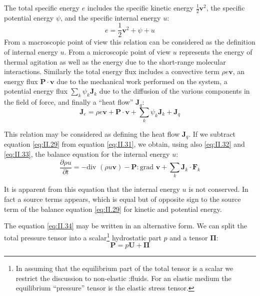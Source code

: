 The total specific energy $e$ includes the specific kinetic energy $\frac{1}{2} \bm{v}^2$, the specific potential energy $\psi$, and the specific internal energy $u$:
\begin{equation}
e = \frac{1}{2} \bm{v}^2 + \psi + u
    \label{eq:II.32}
\end{equation}
From a macroscopic point of view this relation can be considered as
the definition of internal energy $u$. From a microscopic point of view $u$ represents the energy of thermal agitation as well as the energy due
to the short-range molecular interactions. Similarly the total energy
flux includes a convective term $\rho e \bm{v}$, an energy flux $\bm{P} \cdot \bm{v}$ due to the mechanical work performed on the system, a potential energy flux $\sum_k \psi_k \bm{J}_k$ due to the diffusion of the various components in the field of force, and finally a ``heat flow'' $\bm{J}_q$:
\begin{equation}
    \bm{J}_e = \rho e \bm{v} + \bm{P} \cdot \bm{v} + \sum_k \psi_k \bm{J}_k + \bm{J}_q
    \label{eq:II.33}
\end{equation}

This relation may be considered as defining the heat flow $\bm{J}_q$. If we subtract equation \eqref{eq:II.29} from equation \eqref{eq:II.31}, we obtain, using also \eqref{eq:II.32} and \eqref{eq:II.33}, the balance equation for the internal energy $u$:
\begin{equation}
\frac{\partial \rho u}{\partial t} = - \textrm{div } \left( \rho u \bm{v} \right) - \bm{P} : \textrm{grad } \bm{v} + \sum_k \bm{J}_k \cdot \bm{F}_k
    \label{eq:II.34}
\end{equation}

It is apparent from this equation that the internal energy $u$ is not
conserved. In fact a source terms appears, which is equal but of
opposite sign to the source term of the balance equation \eqref{eq:II.29} for kinetic and potential energy.

The equation \eqref{eq:II.34} may be written in an alternative form. We can split the total pressure tensor into a scalar\footnote{In assuming that the equilibrium part of the total tensor is a scalar we
restrict the discussion to non-elastic :fluids. For an elastic medium the equilibrium ``pressure'' tensor is the elastic stress tensor.} hydrostatic part $p$ and a tensor $\bm{\Pi}$:
\begin{equation}
\bm{P} = p \bm{U} + \bm{\Pi}
    \label{eq:II.35}
\end{equation}

